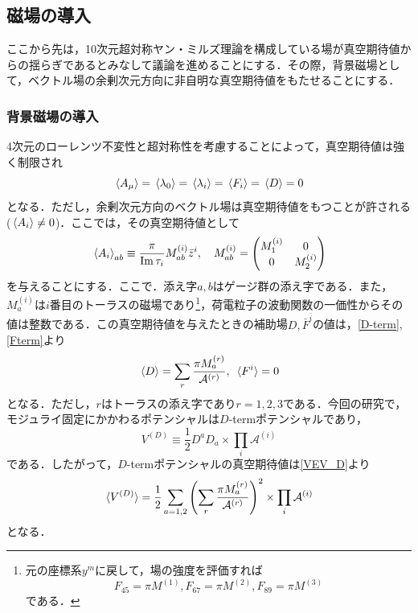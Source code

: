\documentclass[a4paper,uplatex,dvipdfmx]{jsarticle}
\theoremstyle{definition}
\begin{document}
\subsection{磁場の導入}

ここから先は，10次元超対称ヤン・ミルズ理論を構成している場が真空期待値からの揺らぎであるとみなして議論を進めることにする．その際，背景磁場として，ベクトル場の余剰次元方向に非自明な真空期待値をもたせることにする．

\subsubsection{背景磁場の導入}

4次元のローレンツ不変性と超対称性を考慮することによって，真空期待値は強く制限され
\begin{equation}
   \ev*{A_{\mu}}
   =
   \ev*{\lambda_{0}}
   =
   \ev*{\lambda_{i}}
   =
   \ev*{F_{i}}
   =
   \ev*{D}
   =
   0
   \nonumber
\end{equation}
となる．ただし，余剰次元方向のベクトル場は真空期待値をもつことが許される($\ev*{A_{i}}\neq 0$)．ここでは，その真空期待値として
\begin{equation}
   \ev*{A_{i}}_{ab}
   \equiv
   \frac{\pi}{\Im \tau_{i}} M_{ab}^{(i)}\bar{z}^{i}
   ,\quad
   M_{ab}^{(i)}
   =
   \begin{pmatrix}
     M_{1}^{(i)} & 0 \\
     0 & M_{2}^{(i)}
   \end{pmatrix}   
\end{equation}
を与えることにする．ここで．添え字$a,b$はゲージ群の添え字である．また，$M_{a}^{(i)}$は$i$番目のトーラスの磁場であり\footnote{
   元の座標系$y^{m}$に戻して，場の強度を評価すれば
   $$
      F_{45}=\pi M^{(1)},F_{67}=\pi M^{(2)},F_{89}=\pi M^{(3)}
   $$
   である．
}，荷電粒子の波動関数の一価性からその値は整数である．この真空期待値を与えたときの補助場$D,\bar{F}^{\bar{i}}$の値は，\eqref{D-term},\eqref{Fterm}より
\begin{equation}
   \ev*{D}
   =
   \sum_{r}\frac{\pi M_{a}^{(r)}}{\mathcal{A}^{(r)}}
   ,\ 
   \ev*{F^{i}}
   =
   0
   \label{VEV_D}
\end{equation}
となる．ただし，$r$はトーラスの添え字であり$r=1,2,3$である．今回の研究で，モジュライ固定にかかわるポテンシャルは$D$-termポテンシャルであり，
\begin{equation}
   V^{(D)}
   \equiv
   \frac{1}{2}D^{a}D_{a}
   \times
   \prod_{i}\mathcal{A}^{(i)}
   \nonumber
\end{equation}
である．したがって，$D$-termポテンシャルの真空期待値は\eqref{VEV_D}より
\begin{equation}
   \ev*{V^{(D)}}
   =
   \frac{1}{2}\sum_{a=1,2}
   \left(  
      \sum_{r}\frac{\pi M_{a}^{(r)}}{\mathcal{A}^{(r)}}
   \right)^2
   \times
   \prod_{i}\mathcal{A}^{(i)}
   \label{D-term_potential_1}
\end{equation}
となる．
\end{document}
